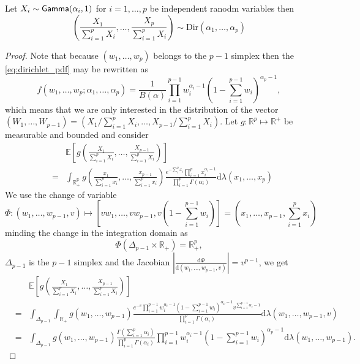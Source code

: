 \begin{prop}\label{prop:gamma_to_dirichlet}
Let $X_i\sim \mathsf{Gamma}(\alpha_i,1)$ for $i = 1,\ldots, p$ be independent ranodm variables then 
\[
\left(\frac{X_1}{\sum_{i=1}^{p}X_i},\ldots, \frac{X_p}{\sum_{i=1}^{p}X_i}\right)\sim\text{Dir}(\alpha_1,\ldots, \alpha_p)
\]
\end{prop}
\begin{proof}
Note that because $(w_1,\ldots, w_p)$ belongs to the $p-1$ simplex then the \pdf \eqref{eq:dirichlet_pdf} may be rewritten as 
$$
f(w_1,\ldots, w_p;\alpha_1,\ldots, \alpha_p) = \frac{1}{B(\alpha)}\prod_{i=1}^{p-1} w_i^{\alpha_i-1}\left(1-\sum_{i=1}^{p-1} w_i\right)^{\alpha_p-1}, 
$$
which means that we are only interested in the distribution of the vector $\left(W_1,\ldots, W_{p-1}\right) = \left(X_{1}/\sum_{i=1}^{p}X_i,\ldots, X_{p-1}/\sum_{i=1}^{p}X_i\right)$.
Let $g:\mathbb{R}^p\mapsto \mathbb{R}^+$ be measurable and bounded and consider
\begin{eqnarray*}
&&\mathbb{E}\left[g\left(\frac{X_1}{\sum_{i=1}^{p}X_i},\ldots, \frac{X_{p-1}}{\sum_{i=1}^{p}X_i}\right)\right]\\
&=&\int_{\mathbb{R_+^p}}g\left(\frac{x_1}{\sum_{i=1}^{p}x_i},\ldots, \frac{x_{p-1}}{\sum_{i=1}^{p}x_i}\right)\frac{e^{-\sum_{i}^px_i}\prod_{i=1}^px_i^{\alpha_i-1}}{\prod_{i=1}^p\Gamma(\alpha_i)}\text{d}\lambda(x_1,\ldots, x_p)
\end{eqnarray*}
We use the change of variable 
\[
\Phi:(w_1,\ldots, w_{p-1}, v) \mapsto \left[vw_1,\ldots, vw_{p-1}, v\left(1-\sum_{i=1}^{p-1}w_i\right)\right] = \left(x_1, \ldots, x_{p-1},\sum_{i=1}^{p}x_i\right)   
\]
minding the change in the integration domain as 
$$
\Phi(\Delta_{p-1}\times \mathbb{R}_+) = \mathbb{R}^p_+ ,
$$
$\Delta_{p-1}$ is the $p-1$ simplex and the Jacobian $\left|\frac{\text{d}\Phi}{\text{d}(w_1,\ldots, w_{p-1},v)}\right|=v^{p-1}$, we get 
 \begin{eqnarray*}
 &&\mathbb{E}\left[g\left(\frac{X_1}{\sum_{i=1}^{p}X_i},\ldots, \frac{X_{p-1}}{\sum_{i=1}^{p}X_i}\right)\right]\\
&=&\int_{\Delta_{p-1}}\int_{\mathbb{R}_+}g\left(w_1,\ldots, w_{p-1}\right) \frac{e^{- v}\prod_{i=1}^{p-1}w_i^{\alpha_i-1}\left(1-\sum_{i=1}^{p-1}w_i\right)^{\alpha_p-1}v^{\sum_{i=1}^{p-1}\alpha_i-1}}
{\prod_{i=1}^p\Gamma(\alpha_i)}\text{d}\lambda(w_1,\ldots, w_{p-1}, v)\\
&=&\int_{\Delta_{p-1}}g\left(w_1,\ldots, w_{p-1}\right) \frac{\Gamma\left(\sum_{i =1}^{p}\alpha_i\right)}{\prod_{i=1}^p\Gamma(\alpha_i)}\prod_{i=1}^{p-1}w_i^{\alpha_i-1}\left(1-\sum_{i=1}^{p-1}w_i\right)^{\alpha_p-1}\text{d}\lambda(w_1,\ldots, w_{p-1}).
\end{eqnarray*} 
\end{proof}
